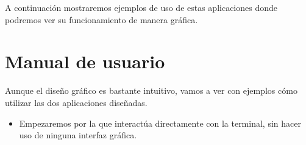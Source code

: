 A continuación mostraremos ejemplos de uso de estas aplicaciones donde podremos ver su funcionamiento de manera gráfica.

\section{Manual de usuario} \label{manual}

Aunque el diseño gráfico es bastante intuitivo, vamos a ver con ejemplos cómo utilizar las dos aplicaciones diseñadas.
\vspace{0.3cm} 

\begin{itemize} 
    
    \item Empezaremos por la que interactúa directamente con la terminal, sin hacer uso de ninguna interfaz gráfica.
\end{itemize}
    
